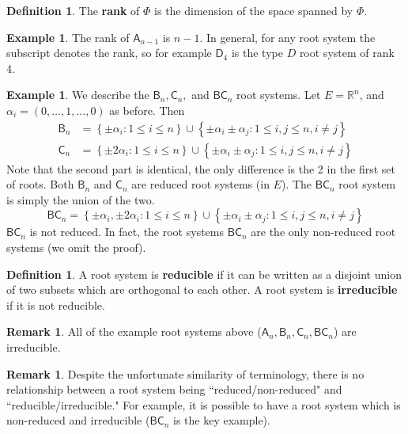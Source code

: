 \documentclass[12pt]{article}
\theoremstyle{definition}
\newtheorem{definition}[theorem]{Definition}
\newtheorem{example}[theorem]{Example}
\newtheorem{remark}[theorem]{Remark}
\numberwithin{theorem}{subsection}
\newcommand{\R}{\mathbb{R}}
\newcommand{\lb}{\left\{}
\newcommand{\rb}{\right\}}
\newcommand{\tbf}{\textbf}
\begin{document}
\begin{definition}
The \tbf{rank} of $\Phi$ is the dimension of the space spanned by $\Phi$.
\end{definition}

\begin{example}
The rank of $\mathsf{A}_{n-1}$ is $n-1$. In general, for any root system the subscript denotes the rank, so for example $\mathsf{D}_4$ is the type $D$ root system of rank 4.
\end{example}

\begin{example}
We describe the $\mathsf{B}_n, \mathsf{C}_n,$ and $\mathsf{BC}_n$ root systems. Let $E = \R^n$, and $\alpha_i = (0, \ldots, 1, \ldots, 0)$ as before. Then
\begin{align*}
	\mathsf{B}_n &= \lb \pm \alpha_i : 1 \le i \le n \rb \cup \lb \pm \alpha_i \pm \alpha_j : 1 \le i, j \le n, i \neq j \rb \\
	\mathsf{C}_n &= \lb \pm 2\alpha_i : 1 \le i \le n \rb \cup \lb \pm \alpha_i \pm \alpha_j : 1 \le i,j \le n, i \neq j \rb
\end{align*}
Note that the second part is identical, the only difference is the 2 in the first set of roots. Both $\mathsf{B}_n$ and $\mathsf{C}_n$ are reduced root systems (in $E$). The $\mathsf{BC}_n$ root system is simply the union of the two.
\[
	\mathsf{BC}_n = \lb \pm \alpha_i, \pm 2\alpha_i : 1 \le i \le n \rb \cup \lb \pm \alpha_i \pm \alpha_j : 1 \le i,j \le n, i \neq j \rb
\]
$\mathsf{BC}_n$ is not reduced. In fact, the root systems $\mathsf{BC}_n$ are the only non-reduced root systems (we omit the proof).
\end{example}

\begin{definition}
A root system is \tbf{reducible} if it can be written as a disjoint union of two subsets which are orthogonal to each other. A root system is \tbf{irreducible} if it is not reducible.
\end{definition}

\begin{remark}
All of the example root systems above ($\mathsf{A}_n, \mathsf{B}_n, \mathsf{C}_n, \mathsf{BC}_n$) are irreducible.
\end{remark}

\begin{remark}
Despite the unfortunate similarity of terminology, there is no relationship between a root system being ``reduced/non-reduced" and ``reducible/irreducible." For example, it is possible to have a root system which is non-reduced and irreducible ($\mathsf{BC}_n$ is the key example). 
\end{remark}
\end{document}

